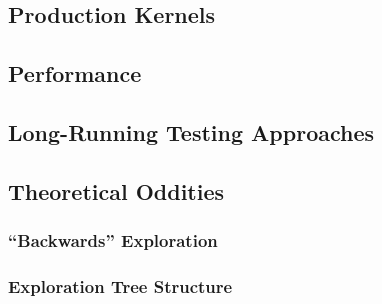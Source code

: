 \subsection{Production Kernels}
\label{sec:future-linux}


\subsection{Performance}
\label{sec:future-perf}

\subsection{Long-Running Testing Approaches}
\label{sec:future-shaping}

\subsection{Theoretical Oddities}
\label{sec:future-theory}

\subsubsection{``Backwards'' Exploration}
\label{sec:future-backwards}

\subsubsection{Exploration Tree Structure}

